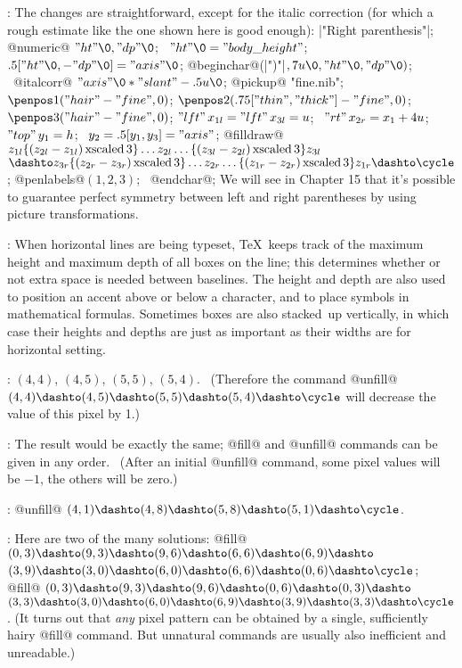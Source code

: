 :
 The changes are straightforward, except for the italic correction
(for which a rough estimate like the one shown here is good enough):
\def\xs(#1,#2){\{(z_{#1}-z_{#2})\,{\rm xscaled}\,3\}}%
\begindisplay
|"Right parenthesis"|;\cr
@numeric@ $"ht"\0,"dp"\0$; \
 $"ht"\0="body\_height"$; \
 $.5["ht"\0,-"dp"\0]="axis"\0$;\cr
@beginchar@\kern1pt(|")"|$,7u\0,"ht"\0,"dp"\0)$;
 \ @italcorr@ $"axis"\0\ast"slant"-.5u\0$;\cr
@pickup@ "fine.nib"; \ $\penpos1("hair"-"fine",0)$;\cr
$\penpos2(.75["thin","thick"]-"fine",0)$; \ $\penpos3("hair"-"fine",0)$;\cr
$\mathop{"lft"}x_{1l}=\mathop{"lft"}x_{3l}=u$; \
 $\mathop{"rt"}x_{2r}=x_1+4u$; \
$\mathop{"top"}y_1=h$; \
 $y_2=.5[y_1,y_3]="axis"$;\cr
@filldraw@ $z_{1l}\xs(2l,1l)\ldots z_{2l}\ldots\xs(3l,2l)z_{3l}$\cr
\qquad$\dashto z_{3r}\xs(2r,3r)
 \ldots z_{2r}\ldots\xs(1r,2r)z_{1r}\dashto\cycle$;\cr
@penlabels@$(1,2,3)$; \ @endchar@;\cr
\enddisplay
We will see in Chapter 15 that it's possible to guarantee perfect symmetry
between left and right parentheses by using picture transformations.

\ansno12.2:
 When horizontal lines are being typeset, \TeX\ keeps track of the
maximum height and maximum depth of all boxes on the line; this determines
whether or not extra space is needed between baselines. The height and depth
are also used to position an accent above or below a character, and to
place symbols in mathematical formulas. Sometimes
boxes are also stacked~up vertically, in which case their heights and depths
are just as important as their widths are for horizontal setting.

\ansno13.1:
 $(4,4)$, $(4,5)$, $(5,5)$, $(5,4)$. \ (Therefore the command
\begindisplay
@unfill@ $(4,4)\dashto(4,5)\dashto(5,5)\dashto(5,4)\dashto\cycle$
\enddisplay
will decrease the value of this pixel by 1.)

\ansno13.2:
 The result would be exactly the same; @fill@ and @unfill@ commands
can be given in any order. \ (After an initial @unfill@ command, some
pixel values will be $-1$, the others will be zero.)

\ansno13.3:
 @unfill@ $(4,1)\dashto(4,8)\dashto(5,8)\dashto(5,1)\dashto\cycle$.

\ansno13.4:
 Here are two of the many solutions:
\begindisplay
@fill@ $(0,3)\dashto(9,3)\dashto(9,6)\dashto(6,6)\dashto(6,9)\dashto$\cr
\indent $(3,9)\dashto(3,0)\dashto(6,0)\dashto(6,6)\dashto(0,6)\dashto\cycle$;\cr
@fill@ $(0,3)\dashto(9,3)\dashto(9,6)\dashto(0,6)\dashto(0,3)\dashto$\cr
\indent $(3,3)\dashto(3,0)\dashto(6,0)\dashto(6,9)\dashto(3,9)\dashto
  (3,3)\dashto\cycle$.\cr
\enddisplay
(It turns out that {\sl any\/} pixel pattern can be obtained by a single,
sufficiently hairy @fill@ command. But unnatural commands are usually also
inefficient and unreadable.)


